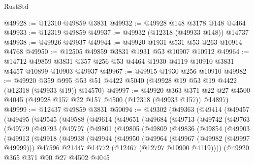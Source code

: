 \begin{lexlean}{RustStd}
\begin{coremodule}
@49928 := @12310 @49859 @3831
@49932 := @49928 @148 @3178 @148 @4464
@49933 := @12319 @49859
@49937 := @49932 (@12318 (@49933 @148)) @14737
@49938 := @49926 @49937
@49944 := @49920 @1931 @531 @53 @263 @10914 @4768
@49950 := @12505 @49859 @3831 @1931 @53 @10907 @10912
@49964 := @14712
    @49859
    @3831
    @357
    @256
    @53
    @4464
    @1930
    @4119
    @10910
    @3831
    @4457
    @10899
    @10903
    @49937
@49967 := @49915 @1930 @256 @10910
@49982 := @49920
    @359
    @995
    @53
    @51
    @4422
    @5040
    (@49928 @19 @53 @19 @4422 (@12318 (@49933 @19)) @14570)
@49997 := @49920
    @363
    @371
    @22
    @27
    @4500
    @4045
    (@49928 @157 @22 @157 @4500 (@12318 (@49933 @157)) @14897)
@49999 := @12437 @49859 @3831
@50094 := @49302
    (@49363
      (@49414
        (@49457
          (@49495
            (@49545
              (@49588
                (@49614
                  (@49651
                    (@49684
                      (@49713
                        (@49742
                          (@49763
                            (@49779
                              (@49793
                                (@49797
                                  (@49801
                                    (@49805
                                      (@49809
                                        (@49836
                                          (@49854
                                            (@49903
                                              (@49913
                                                (@49918
                                                  (@49938
                                                    (@49944
                                                      (@49950
                                                        (@49964
                                                          (@49967 (@49982 (@49997 @49999)))
                                                          @47596
                                                          @21447
                                                          @14772
                                                          (@12467 (@12797 @10900 @4119))))
                                                      (@49920
                                                        @365
                                                        @371
                                                        @90
                                                        @27
                                                        @4502
                                                        @4045

\end{coremodule}
\end{lexlean}
